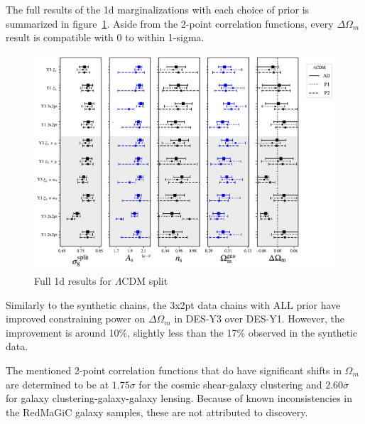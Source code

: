 The full results of the 1d marginalizations with each choice of prior is summarized in figure~\ref{fig:lcdm_result_1d}. Aside from the 2-point correlation functions, every $\Delta\Omega_m$ result is compatible with 0 to within 1-sigma.
\begin{figure}[ht]
	\centering
	\includegraphics[width=\textwidth]{plots/plot_1d_resultv5.pdf}
	\caption{Full 1d results for $\Lambda$CDM split}
	\label{fig:lcdm_result_1d}
\end{figure}
Similarly to the synthetic chains, the 3x2pt data chains with ALL prior have improved constraining power on $\Delta\Omega_m$ in DES-Y3 over DES-Y1. However, the improvement is around 10\%, slightly less than the 17\% observed in the synthetic data. 

The mentioned 2-point correlation functions that do have significant shifts in $\Omega_m$ are determined to be at $1.75\sigma$ for the cosmic shear-galaxy clustering and $2.60\sigma$ for galaxy clustering-galaxy-galaxy lensing. Because of known inconsistencies in the RedMaGiC galaxy samples, these are not attributed to discovery.
